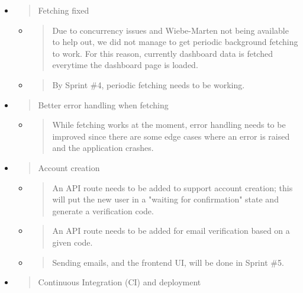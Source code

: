 \begin{itemize}
\item
  \begin{quote}
  Fetching fixed
  \end{quote}

  \begin{itemize}
  \item
    \begin{quote}
    Due to concurrency issues and Wiebe-Marten not being available to
    help out, we did not manage to get periodic background fetching to
    work. For this reason, currently dashboard data is fetched everytime
    the dashboard page is loaded.
    \end{quote}
  \item
    \begin{quote}
    By Sprint \#4, periodic fetching needs to be working.
    \end{quote}
  \end{itemize}
\item
  \begin{quote}
  Better error handling when fetching
  \end{quote}

  \begin{itemize}
  \item
    \begin{quote}
    While fetching works at the moment, error handling needs to be
    improved since there are some edge cases where an error is raised
    and the application crashes.
    \end{quote}
  \end{itemize}
\item
  \begin{quote}
  Account creation
  \end{quote}

  \begin{itemize}
  \item
    \begin{quote}
    An API route needs to be added to support account creation; this
    will put the new user in a "waiting for confirmation" state and
    generate a verification code.
    \end{quote}
  \item
    \begin{quote}
    An API route needs to be added for email verification based on a
    given code.
    \end{quote}
  \item
    \begin{quote}
    Sending emails, and the frontend UI, will be done in Sprint \#5.
    \end{quote}
  \end{itemize}
\item
  \begin{quote}
  Continuous Integration (CI) and deployment
  \end{quote}


\end{itemize}
